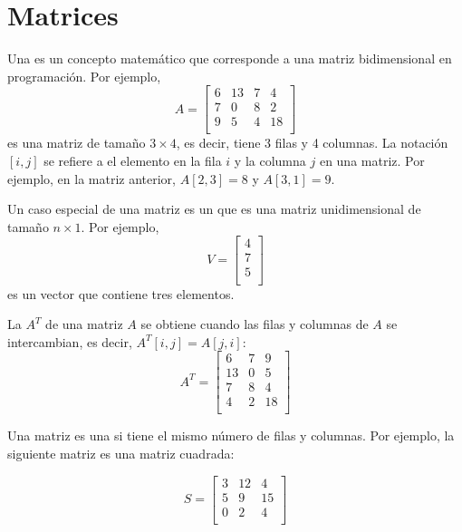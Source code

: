 \chapter{Matrices}


Una  es un concepto matemático
que corresponde a una matriz bidimensional
en programación. Por ejemplo,
\[
A = 
 \begin{bmatrix}
  6 & 13 & 7 & 4 \\
  7 & 0 & 8 & 2 \\
  9 & 5 & 4 & 18 \\
 \end{bmatrix}
\]
es una matriz de tamaño $3 \times 4$, es decir,
tiene 3 filas y 4 columnas.
La notación $[i,j]$ se refiere a
el elemento en la fila $i$ y la columna $j$
en una matriz.
Por ejemplo, en la matriz anterior,
$A[2,3]=8$ y $A[3,1]=9$.


Un caso especial de una matriz es un 
que es una matriz unidimensional de tamaño $n \times 1$.
Por ejemplo,
\[
V =
\begin{bmatrix}
4 \\
7 \\
5 \\
\end{bmatrix}
\]
es un vector que contiene tres elementos.


La  $A^T$ de una matriz $A$
se obtiene cuando las filas y columnas de $A$
se intercambian, es decir, $A^T[i,j]=A[j,i]$:
\[
A^T = 
 \begin{bmatrix}
  6 & 7 & 9 \\
  13 & 0 & 5 \\
  7 & 8 & 4 \\
  4 & 2 & 18 \\
 \end{bmatrix}
\]


Una matriz es una  si
tiene el mismo número de filas y columnas.
Por ejemplo, la siguiente matriz es una
matriz cuadrada:

\[
S = 
 \begin{bmatrix}
  3 & 12 & 4  \\
  5 & 9 & 15  \\
  0 & 2 & 4 \\
 \end{bmatrix}
\]

